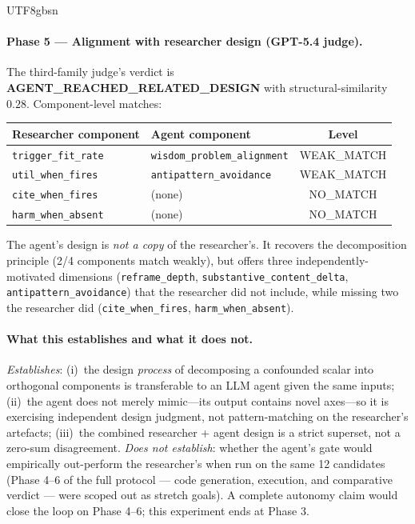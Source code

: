 \documentclass{article}
\begin{document}
\begin{CJK*}{UTF8}{gbsn}
\paragraph{Phase 5 — Alignment with researcher design (GPT-5.4
judge).} The third-family judge's verdict is \textbf{AGENT\_REACHED\_RELATED\_DESIGN}
with structural-similarity \(0.28\). Component-level matches:

\begin{center}\small
\begin{tabular}{l l c}
  \toprule
  Researcher component & Agent component & Level \\
  \midrule
  \texttt{trigger\_fit\_rate} & \texttt{wisdom\_problem\_alignment}
    & WEAK\_MATCH \\
  \texttt{util\_when\_fires}  & \texttt{antipattern\_avoidance}
    & WEAK\_MATCH \\
  \texttt{cite\_when\_fires}  & (none)
    & NO\_MATCH \\
  \texttt{harm\_when\_absent} & (none)
    & NO\_MATCH \\
  \bottomrule
\end{tabular}
\end{center}

The agent's design is \emph{not a copy} of the researcher's.
It recovers the decomposition principle (2/4 components
match weakly), but offers three independently-motivated
dimensions (\texttt{reframe\_depth}, \texttt{substantive\_content\_delta},
\texttt{antipattern\_avoidance}) that the researcher did not
include, while missing two the researcher did
(\texttt{cite\_when\_fires}, \texttt{harm\_when\_absent}).

\paragraph{What this establishes and what it does not.}
\emph{Establishes}: (i)~the design \emph{process} of
decomposing a confounded scalar into orthogonal components is
transferable to an LLM agent given the same inputs; (ii)~the
agent does not merely mimic—its output contains novel
axes—so it is exercising independent design judgment, not
pattern-matching on the researcher's artefacts; (iii)~the
combined researcher + agent design is a strict superset, not
a zero-sum disagreement.
\emph{Does not establish}: whether the agent's gate would
empirically out-perform the researcher's when run on the same
12 candidates (Phase 4–6 of the full protocol — code
generation, execution, and comparative verdict — were scoped
out as stretch goals). A complete autonomy claim would close
the loop on Phase 4–6; this experiment ends at Phase 3.


\end{CJK*}
\end{document}

